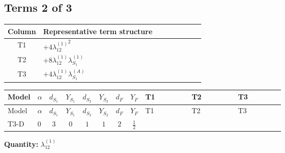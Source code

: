 \documentclass[8pt]{article}
\begin{document}
\begin{landscape}
\subsection*{Terms 2 of 3}
\begin{center}
\begin{tabular}{@{}c >{\raggedright\arraybackslash}p{0.82\linewidth}@{}}
\toprule
Column & Representative term structure \\
\midrule
T1 & \(\displaystyle +4 {\lambda_{12}^{(1)}}^2\) \\
\midrule
T2 & \(\displaystyle +8 {\lambda_{12}^{(1)}} {\lambda_{S_1}^{(1)}}\) \\
\midrule
T3 & \(\displaystyle +4 {\lambda_{12}^{(1)}} {\lambda_{S_1}^{(A)}}\) \\
\midrule
\bottomrule
\end{tabular}
\end{center}
\smallskip
\tiny
\begin{longtable}{@{}llcccccc >{\raggedright\arraybackslash}p{0.21\linewidth} >{\raggedright\arraybackslash}p{0.21\linewidth} >{\raggedright\arraybackslash}p{0.21\linewidth}@{}}
\toprule
Model & $\alpha$ & $d_{S_1}$ & $Y_{S_1}$ & $d_{S_2}$ & $Y_{S_2}$ & $d_F$ & $Y_F$ & T1 & T2 & T3 \\
\midrule
\endfirsthead
\toprule
Model & $\alpha$ & $d_{S_1}$ & $Y_{S_1}$ & $d_{S_2}$ & $Y_{S_2}$ & $d_F$ & $Y_F$ & T1 & T2 & T3 \\
\midrule
\endhead
T3-D & $0$ & $3$ & $0$ & $1$ & $1$ & $2$ & $\frac{1}{2}$ & \scriptsize\adjustbox{max width=\linewidth}{$\begin{gathered} +4 {\lambda_{12}^{(1)}}^2\end{gathered}$} & \scriptsize\adjustbox{max width=\linewidth}{$\begin{gathered} +8 {\lambda_{12}^{(1)}} {\lambda_{S_1}^{(1)}}\end{gathered}$} & \scriptsize\adjustbox{max width=\linewidth}{$\begin{gathered} +4 {\lambda_{12}^{(1)}} {\lambda_{S_1}^{(A)}}\end{gathered}$} \\
\midrule
\bottomrule
\end{longtable}
\clearpage
\noindent\textbf{Quantity: }$\lambda_{12}^{(1)}$\par\smallskip

\end{landscape}
\end{document}
